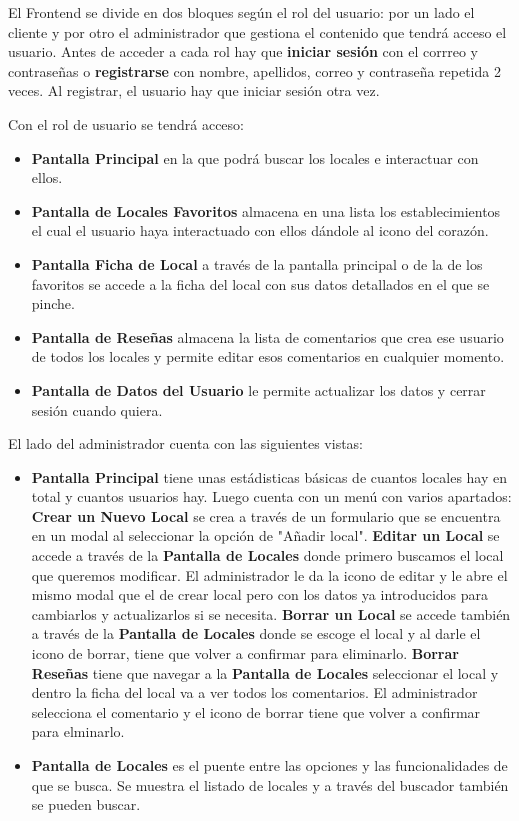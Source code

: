 \documentclass[a4paper,11pt]{article}
\begin{document}
El Frontend se divide en dos bloques según el rol del usuario: por un lado el cliente y por otro el administrador que gestiona el contenido que tendrá acceso el usuario. Antes de acceder a cada rol hay que \textbf{iniciar sesión} con el corrreo y contraseñas o \textbf{registrarse} con nombre, apellidos, correo y contraseña repetida 2 veces. Al registrar, el usuario hay que iniciar sesión otra vez. 

Con el rol de usuario se tendrá acceso:
\begin{itemize}
    \item \textbf{Pantalla Principal} en la que podrá buscar los locales e interactuar con ellos.
    \item \textbf{Pantalla de Locales Favoritos} almacena en una lista los establecimientos el cual el usuario haya interactuado con ellos dándole al icono del corazón.
    \item \textbf{Pantalla Ficha de Local} a través de la pantalla principal o de la de los favoritos se accede a la ficha del local con sus datos detallados en el que se pinche.
    \item \textbf{Pantalla de Reseñas} almacena la lista de comentarios que crea ese usuario de todos los locales y permite editar esos comentarios en cualquier momento.
    \item \textbf{Pantalla de Datos del Usuario} le permite actualizar los datos y cerrar sesión cuando quiera.
\end{itemize}

El lado del administrador cuenta con las siguientes vistas: 

\begin{itemize}
    \item \textbf{Pantalla Principal} tiene unas estádisticas básicas de cuantos locales hay en total y cuantos usuarios hay. Luego cuenta con un menú con varios apartados:
        \subitem \textbf{Crear un Nuevo Local} se crea a través de un formulario que se encuentra en un modal al seleccionar la opción de "Añadir local".
        \subitem \textbf{Editar un Local} se accede a través de la \textbf{Pantalla de Locales} donde primero buscamos el local que queremos modificar. El administrador le da la icono de editar y le abre el mismo modal que el de crear local pero con los datos ya introducidos para cambiarlos y actualizarlos si se necesita.
        \subitem \textbf{Borrar un Local} se accede también a través de la \textbf{Pantalla de Locales} donde se escoge el local y al darle el icono de borrar, tiene que volver a confirmar para eliminarlo.
        \subitem \textbf{Borrar Reseñas}  tiene que navegar a la \textbf{Pantalla de Locales} seleccionar el local y dentro la ficha del local va a ver todos los comentarios. El administrador selecciona el comentario y el icono de borrar tiene que volver a confirmar para elminarlo.
    \item \textbf{Pantalla de Locales} es el puente entre las opciones y las funcionalidades de que se busca. Se muestra el listado de locales y a través del buscador también se pueden buscar.
\end{itemize}
\end{document}
